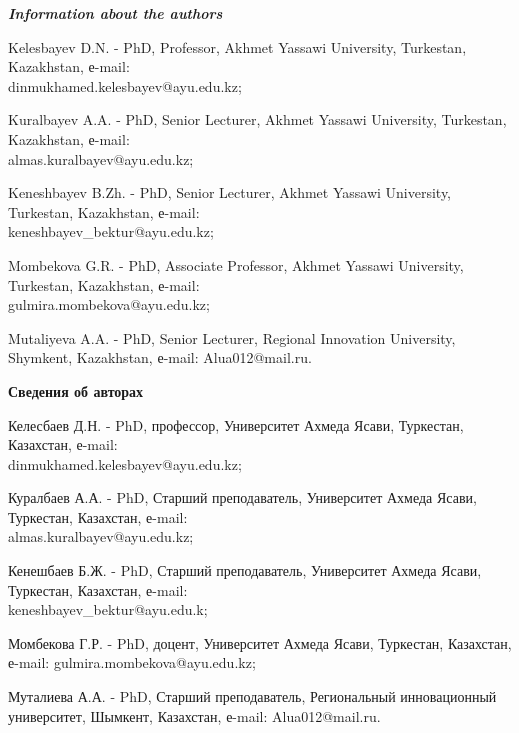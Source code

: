 \begin{authorinfo}
\emph{{\bfseries Information about the authors}}

Kelesbayev D.N. - PhD, Professor, Akhmet Yassawi University, Turkestan,
Kazakhstan, е-mail: \\dinmukhamed.kelesbayev@ayu.edu.kz;

Kuralbayev A.A. - PhD, Senior Lecturer, Akhmet Yassawi University,
Turkestan, Kazakhstan, е-mail: \\almas.kuralbayev@ayu.edu.kz;

Keneshbayev B.Zh. - PhD, Senior Lecturer, Akhmet Yassawi University,
Turkestan, Kazakhstan, е-mail: \\keneshbayev\_bektur@ayu.edu.kz;

Mombekova G.R. - PhD, Associate Professor, Akhmet Yassawi University,
Turkestan, Kazakhstan, е-mail: \\gulmira.mombekova@ayu.edu.kz;

Mutaliyeva A.A. - PhD, Senior Lecturer, Regional Innovation University,
Shymkent, Kazakhstan, е-mail: Alua012@mail.ru.

{\bfseries Сведения об авторах}

Келесбаев Д.Н. - PhD, профессор, Университет Ахмеда Ясави, Туркестан,
Казахстан, е-mail: \\dinmukhamed.kelesbayev@ayu.edu.kz;

Куралбаев А.А. - PhD, Старший преподаватель, Университет Ахмеда Ясави,
Туркестан, Казахстан, е-mail: \\almas.kuralbayev@ayu.edu.kz;

Кенешбаев Б.Ж. - PhD, Старший преподаватель, Университет Ахмеда Ясави,
Туркестан, Казахстан, е-mail: \\keneshbayev\_bektur@ayu.edu.k;

Момбекова Г.Р. - PhD, доцент, Университет Ахмеда Ясави, Туркестан,
Казахстан, е-mail: gulmira.mombekova@ayu.edu.kz;

Муталиева А.А. - PhD, Старший преподаватель, Региональный инновационный
университет, Шымкент, Казахстан, е-mail: Alua012@mail.ru.
\end{authorinfo}
